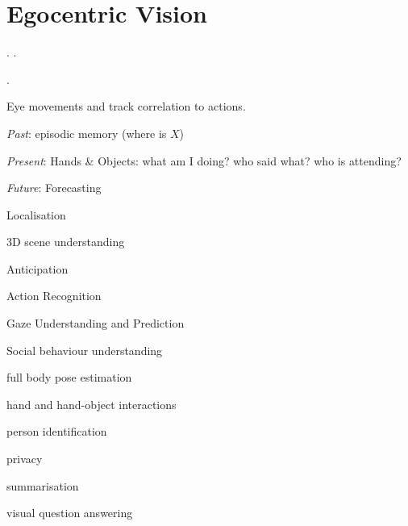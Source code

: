 \section{Egocentric Vision}
\begin{definition}[FPV]
    .
    .
\end{definition}

\begin{definition}[TPV]
    .
\end{definition}

\begin{definition}
    Eye movements and track correlation to actions.
\end{definition}

\begin{definition}
    \begin{itemize*}
        \item \textit{Past}: episodic memory (where is \(X\))
        \item \textit{Present}: Hands \& Objects: what am I doing? who said what? who is attending?
        \item \textit{Future}: Forecasting
    \end{itemize*}
\end{definition}

\begin{definition}
    \begin{itemize*}
        \item Localisation
        \item 3D scene understanding
        \item Anticipation
        \item Action Recognition
        \item Gaze Understanding and Prediction
        \item Social behaviour understanding
        \item full body pose estimation
        \item hand and hand-object interactions
        \item person identification
        \item privacy
        \item summarisation
        \item visual question answering
    \end{itemize*}
\end{definition}

